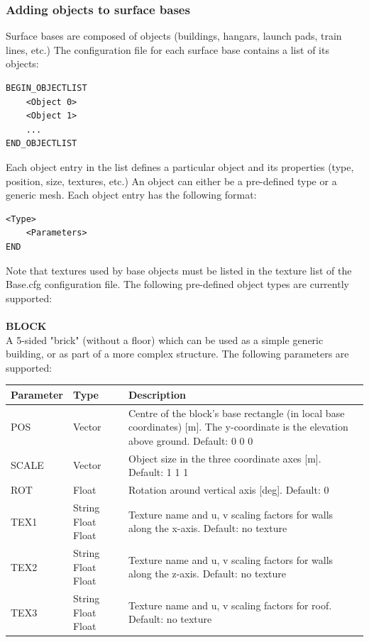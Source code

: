 \documentclass[Orbiter Developer Manual.tex]{subfiles}
\begin{document}
\subsubsection*{Adding objects to surface bases}
Surface bases are composed of objects (buildings, hangars, launch pads, train lines, etc.) The configuration file for each surface base contains a list of its objects:

\begin{lstlisting}[language=OSFS]
BEGIN_OBJECTLIST
	<Object 0>
	<Object 1>
	...
END_OBJECTLIST
\end{lstlisting}

\noindent
Each object entry in the list defines a particular object and its properties (type, position, size, textures, etc.) An object can either be a pre-defined type or a generic mesh. Each object entry has the following format:

\begin{lstlisting}[language=OSFS]
<Type>
	<Parameters>
END
\end{lstlisting}

\noindent
Note that textures used by base objects must be listed in the texture list of the Base.cfg configuration file.
The following pre-defined object types are currently supported:\\
\\
\textbf{BLOCK}\\
A 5-sided "brick" (without a floor) which can be used as a simple generic building, or as part of a more complex structure. The following parameters are supported:

	\begin{longtable}{ |p{}|p{}|p{}| }
	\hline\rule{0pt}{2ex}
	\textbf{Parameter} & \textbf{Type} & \textbf{Description}\\
	\hline\rule{0pt}{2ex}
	POS & Vector & Centre of the block's base rectangle (in local base coordinates) [m]. The y-coordinate is the elevation above ground. Default: 0 0 0\\
	\hline\rule{0pt}{2ex}
	SCALE & Vector & Object size in the three coordinate axes [m]. Default: 1 1 1\\
	\hline\rule{0pt}{2ex}
	ROT & Float & Rotation around vertical axis [deg]. Default: 0\\
	\hline\rule{0pt}{2ex}
	TEX1 & String Float Float & Texture name and u, v scaling factors for walls along the x-axis. Default: no texture\\
	\hline\rule{0pt}{2ex}
	TEX2 & String Float Float & Texture name and u, v scaling factors for walls along the z-axis. Default: no texture\\
	\hline\rule{0pt}{2ex}
	TEX3 & String Float Float & Texture name and u, v scaling factors for roof. Default: no texture\\
	\hline
	\end{longtable}
\end{document}
